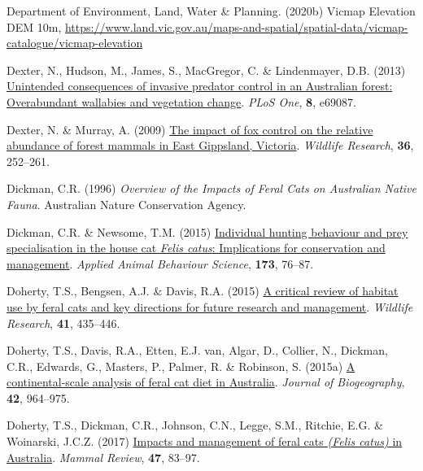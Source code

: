 \documentclass[11pt,a4paper,titlepage,twoside,openright]{style/unimelbthesis}
\newenvironment{CSLReferences}%
  {}%
  {\par}
\begin{document}
\begin{mainmatter}
\begin{CSLReferences}{1}{0}
\leavevmode{}%
Department of Environment, Land, Water \& Planning. (2020b) Vicmap {E}levation {DEM} 10m, \url{https://www.land.vic.gov.au/maps-and-spatial/spatial-data/vicmap-catalogue/vicmap-elevation}

\leavevmode{}%
Dexter, N., Hudson, M., James, S., MacGregor, C. \& Lindenmayer, D.B. (2013) \href{https://doi.org/10.1371/journal.pone.0069087}{Unintended consequences of invasive predator control in an {A}ustralian forest: Overabundant wallabies and vegetation change}. \emph{PLoS One}, \textbf{8}, e69087.

\leavevmode{}%
Dexter, N. \& Murray, A. (2009) \href{https://doi.org/10.1071/WR08135}{The impact of fox control on the relative abundance of forest mammals in {East Gippsland, Victoria}}. \emph{Wildlife Research}, \textbf{36}, 252--261.

\leavevmode{}%
Dickman, C.R. (1996) \emph{Overview of the Impacts of Feral Cats on {{A}ustralian} Native Fauna}. {A}ustralian Nature Conservation Agency.

\leavevmode{}%
Dickman, C.R. \& Newsome, T.M. (2015) \href{https://doi.org/10.1016/j.applanim.2014.09.021}{Individual hunting behaviour and prey specialisation in the house cat \emph{{F}elis catus}: Implications for conservation and management}. \emph{Applied Animal Behaviour Science}, \textbf{173}, 76--87.

\leavevmode{}%
Doherty, T.S., Bengsen, A.J. \& Davis, R.A. (2015) \href{https://doi.org/10.1071/WR14159}{A critical review of habitat use by feral cats and key directions for future research and management}. \emph{Wildlife Research}, \textbf{41}, 435--446.

\leavevmode{}%
Doherty, T.S., Davis, R.A., Etten, E.J. van, Algar, D., Collier, N., Dickman, C.R., Edwards, G., Masters, P., Palmer, R. \& Robinson, S. (2015a) \href{https://doi.org/10.1111/jbi.12469}{A continental-scale analysis of feral cat diet in {A}ustralia}. \emph{Journal of Biogeography}, \textbf{42}, 964--975.

\leavevmode{}%
Doherty, T.S., Dickman, C.R., Johnson, C.N., Legge, S.M., Ritchie, E.G. \& Woinarski, J.C.Z. (2017) \href{https://doi.org/10.1111/mam.12080}{Impacts and management of feral cats \emph{({Felis catus})} in {{A}ustralia}}. \emph{Mammal Review}, \textbf{47}, 83--97.


\end{CSLReferences}
\end{mainmatter}
\end{document}
